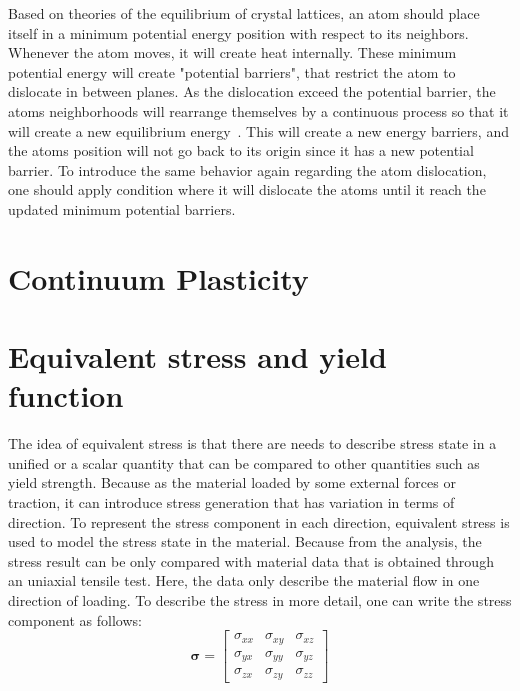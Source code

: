 \documentclass[12pt]{article}
\begin{document}
\hspace{2em}
Based on theories of the equilibrium of crystal lattices, an atom should place itself in a minimum potential energy position
with respect to its neighbors. Whenever the atom moves, it will create heat internally. These minimum potential energy
will create "potential barriers", that restrict the atom to dislocate in between planes. As the dislocation exceed the
potential barrier, the atoms neighborhoods will rearrange themselves by a continuous process so that it will create a 
new equilibrium energy~\cite{taylor1934plastic}. This will create a new energy barriers, and the atoms position will not go back to
its origin since it has a new potential barrier. To introduce the same behavior again regarding the atom dislocation, 
one should apply condition where it will dislocate the atoms until it reach the updated minimum potential barriers.

\section*{Continuum Plasticity}
\section{Equivalent stress and yield function}
\hspace{2em}
The idea of equivalent stress is that there are needs to describe stress state in a unified or a scalar quantity
that can be compared to other quantities such as yield strength. Because as the material loaded by some external forces or traction,
it can introduce stress generation that has variation in terms of direction. To represent the stress component in each
direction, equivalent stress is used to model the stress state in the material. Because from the analysis, the stress result
can be only compared with material data that is obtained through an uniaxial tensile test. Here, the data only describe
the material flow in one direction of loading. To describe the stress in more detail, one can write the stress component as follows:
\begin{equation}
\boldsymbol{\sigma} = 
\begin{bmatrix}
\sigma_{xx} & \sigma_{xy} & \sigma_{xz} \\
\sigma_{yx} & \sigma_{yy} & \sigma_{yz} \\
\sigma_{zx} & \sigma_{zy} & \sigma_{zz}
\end{bmatrix}
\end{equation}
\end{document}
